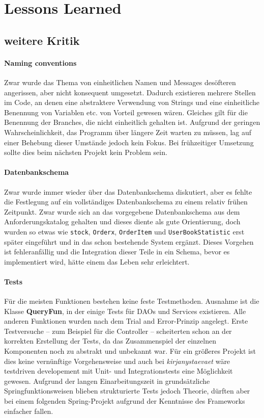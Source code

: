 \section{Lessons Learned}

	\subsection{weitere Kritik}	
		\paragraph{Naming conventions} Zwar wurde das Thema von einheitlichen Namen und Messages desöfteren angerissen, aber nicht konsequent umgesetzt. Dadurch existieren mehrere Stellen im Code, an denen eine abstraktere Verwendung von Strings und eine einheitliche Benennung von Variablen etc. von Vorteil gewesen wären. Gleiches gilt für die Benennung der Branches, die nicht einheitlich gehalten ist. Aufgrund der geringen Wahrscheinlichkeit, das Programm über längere Zeit warten zu müssen, lag auf einer Behebung dieser Umstände jedoch kein Fokus. Bei frühzeitiger Umsetzung sollte dies beim nächsten Projekt kein Problem sein.
		
		\paragraph{Datenbankschema} Zwar wurde immer wieder über das Datenbankschema diskutiert, aber es fehlte die Festlegung auf ein vollständiges Datenbankschema zu einem relativ frühen Zeitpunkt. Zwar wurde sich an das vorgegebene Datenbankschema aus dem Anforderungskatalog gehalten und dieses diente als gute Orientierung, doch wurden so etwas wie \texttt{stock}, \texttt{Orderx}, \texttt{OrderItem} und \texttt{UserBookStatistic} erst später eingeführt und in das schon bestehende System ergänzt. Dieses Vorgehen ist fehleranfällig und die Integration dieser Teile in ein Schema, bevor es implementiert wird, hätte einem das Leben sehr erleichtert.
		
		\paragraph{Tests} Für die meisten Funktionen bestehen keine feste Testmethoden. Ausnahme ist die Klasse \textbf{QueryFun}, in der einige Tests für DAOs und Services existieren. Alle anderen Funktionen wurden nach dem Trial and Error-Prinzip angelegt. Erste Testversuche -- zum Beispiel für die Controller -- scheiterten schon an der korrekten Erstellung der Tests, da das Zusammenspiel der einzelnen Komponenten noch zu abstrakt und unbekannt war. Für ein größeres Projekt ist dies keine vernünftige Vorgehensweise und auch bei \textit{kirjanystaevaet} wäre testdriven developement mit Unit- und Integrationstests eine Möglichkeit gewesen. Aufgrund der langen Einarbeitungszeit in grundsätzliche Springfunktionsweisen blieben strukturierte Tests jedoch Theorie, dürften aber bei einem folgenden Spring-Projekt aufgrund der Kenntnisse des Frameworks einfacher fallen.

